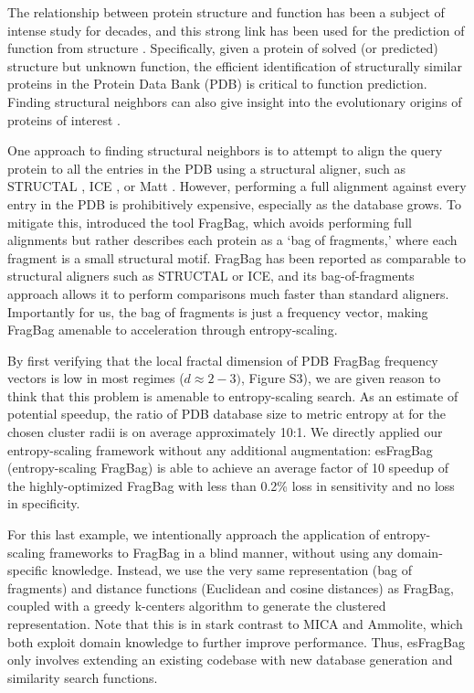 \documentclass[review,preprint,12pt]{elsarticle}
\renewcommand{\cite}{\citep} %
\theoremstyle{definition}
\theoremstyle{remark}
\numberwithin{equation}{section}
\begin{document}
The relationship between protein structure and function has been a subject of intense study for decades,
and this strong link has been used for the prediction of function from structure \cite{hegyi1999relationship}.
Specifically, given a protein of solved (or predicted) structure but unknown function, the efficient identification
of structurally similar proteins in the Protein Data Bank (PDB) is critical to function prediction.
Finding structural neighbors can also give insight into the evolutionary origins of proteins of interest \cite{yona1999protomap,nepomnyachiy2014global}.

One approach to finding structural neighbors is to attempt to align the query protein to all the entries in the PDB using a structural aligner, such as 
STRUCTAL \cite{subbiah1993structural}, ICE \cite{shindyalov1998protein}, or 
Matt \cite{menke2008matt}.
However, performing a full alignment against every entry in the PDB is prohibitively expensive, especially as the database grows.
To mitigate this, \citep{budowski2010fragbag} introduced the tool FragBag, which avoids performing full alignments but rather describes each protein as a
`bag of fragments,' where each fragment is a small structural motif.
FragBag has been reported as comparable to structural aligners such as STRUCTAL or ICE,
and its bag-of-fragments approach
allows it to perform comparisons much faster than standard aligners.
Importantly for us, the bag of fragments is just a frequency vector, making
FragBag amenable to acceleration through entropy-scaling.

By first verifying that the local fractal dimension of PDB FragBag frequency vectors is low in most regimes ($d \approx 2-3)$, Figure S3), we are given reason to think that this problem is amenable to entropy-scaling search.
As an estimate of potential speedup, the ratio of PDB database size to metric 
entropy at for the chosen cluster radii is on average approximately 10:1.
We directly applied our entropy-scaling framework without any additional 
augmentation: esFragBag (entropy-scaling FragBag) is able to achieve an average
factor of 10 speedup of the highly-optimized FragBag with less than 0.2\% loss 
in sensitivity and no loss in specificity.

For this last example, we intentionally approach the application of entropy-scaling frameworks to FragBag in a blind manner,
without using any domain-specific knowledge.
Instead, we use the very same representation (bag of fragments) and distance functions (Euclidean and cosine distances)
as FragBag, coupled with a greedy k-centers algorithm to generate the clustered representation.
Note that this is in stark contrast to MICA and Ammolite, which both exploit domain knowledge to further improve performance.
Thus, esFragBag only involves extending an existing codebase with new database generation and similarity search functions.
\end{document}
